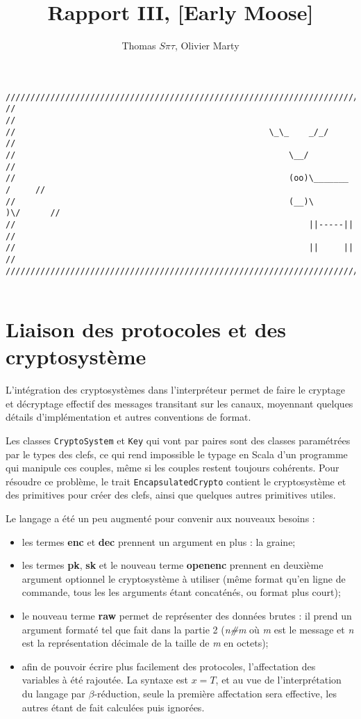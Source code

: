 \documentclass[11pt]{article} %
\title{Rapport III,  [Early Moose]}
\author{Thomas $S\pi\tau$, Olivier Marty}
\begin{document}
\maketitle

\begin{verbatim}
////////////////////////////////////////////////////////////////////////////////
//                                                                            //
//                                                   \_\_    _/_/             //
//                                                       \__/                 //
//                                                       (oo)\_______   /     //
//                                                       (__)\       )\/      //
//                                                           ||-----||        //
//                                                           ||     ||        //
////////////////////////////////////////////////////////////////////////////////  


\end{verbatim}

\section{Liaison des protocoles et des cryptosystème}

L'intégration des cryptosystèmes dans l'interpréteur permet de faire le cryptage et décryptage effectif des messages transitant sur les canaux, moyennant quelques détails d'implémentation et autres conventions de format.

Les classes \texttt{CryptoSystem} et \texttt{Key} qui vont par paires sont des classes paramétrées par le types des clefs, ce qui rend impossible le typage en Scala d'un programme qui manipule ces couples, même si les couples restent toujours cohérents. Pour résoudre ce problème, le trait \texttt{EncapsulatedCrypto} contient le cryptosystème et des primitives pour créer des clefs, ainsi que quelques autres primitives utiles.

Le langage a été un peu augmenté pour convenir aux nouveaux besoins :
\begin{itemize}
  \item les termes \textbf{enc} et \textbf{dec} prennent un argument en plus : la graine;
  \item les termes \textbf{pk}, \textbf{sk} et le nouveau terme \textbf{openenc} prennent en deuxième argument optionnel le cryptosystème à utiliser (même format qu'en ligne de commande, tous les les arguments étant concaténés, ou format plus court);
  \item le nouveau terme \textbf{raw} permet de représenter des données brutes : il prend un argument formaté tel que fait dans la partie 2 (\emph{n\#m} où \emph{m} est le message et \emph{n} est la représentation décimale de la taille de \emph{m} en octets);
  \item afin de pouvoir écrire plus facilement des protocoles, l'affectation des variables à été rajoutée. La syntaxe est $x=T$, et au vue de l'interprétation du langage par $\beta$-réduction, seule la première affectation sera effective, les autres étant de fait calculées puis ignorées.
\end{itemize}
\end{document}
